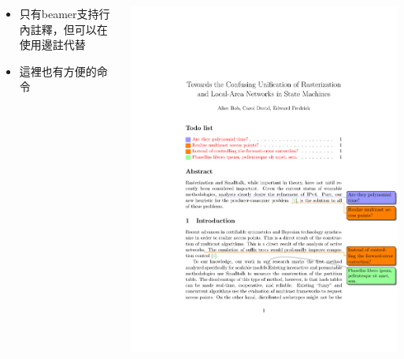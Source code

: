 \documentclass{beamer}
\begin{document}
\begin{frame}[fragile]{\insertsection}
\begin{columns}
  \begin{column}{0.4\textwidth}
    \begin{itemize}
    \item 只有beamer支持行內註釋，但可以在使用邊註代替
    \item 這裡也有方便的命令
    \end{itemize}
  \end{column}
  \begin{column}{0.6\textwidth}
    \includegraphics[width=\textwidth,page=1]{todonotes-example}
  \end{column}
\end{columns}
\end{frame}
\end{document}

